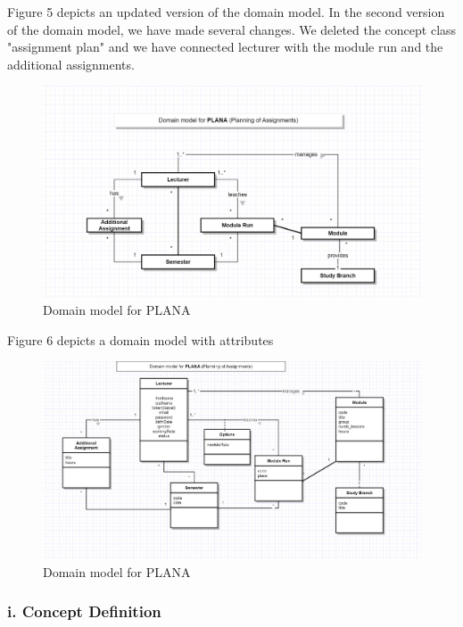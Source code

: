 \documentclass{scrartcl}
\begin{document}
Figure 5 depicts an updated version of the domain model. In the second version of the domain model, we have made several changes. We deleted the concept class "assignment plan" and we have connected lecturer with the module run and the additional assignments. 
\begin{figure}[H]
\centering
\includegraphics[width=150mm]{uml/domain_last}
\caption{Domain model for  PLANA}
\label{Domain model 2nd version}
\end{figure} 

Figure 6 depicts a domain model with attributes

\begin{figure}[H]
\centering
\includegraphics[width=150mm]{uml/domain_attributes}
\caption{Domain model for  PLANA}
\label{Domain model  with attributes}
\end{figure} 


	    \subsubsection{i. Concept Definition}
	    
\end{document}
